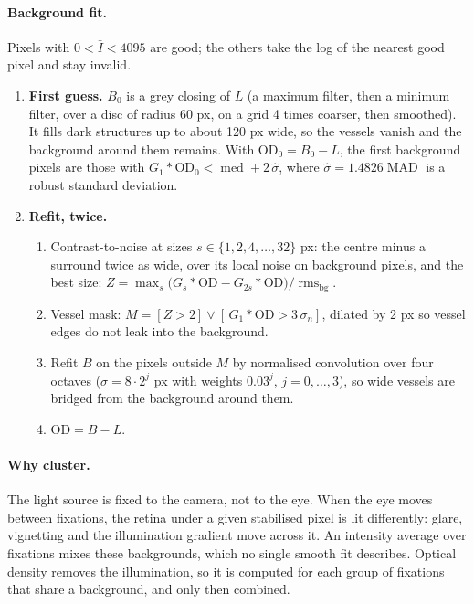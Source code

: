 \documentclass[11pt]{article}
\newcommand{\OD}{\mathrm{OD}}
\begin{document}
\paragraph{Background fit.} Pixels with $0 < \bar I < 4095$ are good; the others take the log of the nearest good
pixel and stay invalid.
\begin{enumerate}
  \item \textbf{First guess.} $B_0$ is a grey closing of $L$ (a maximum filter, then a minimum filter, over a disc
        of radius 60 px, on a grid 4 times coarser, then smoothed). It fills dark structures up to about 120 px
        wide, so the vessels vanish and the background around them remains. With $\OD_0 = B_0 - L$, the first
        background pixels are those with $G_1 * \OD_0 < \operatorname{med} + 2\,\hat\sigma$, where
        $\hat\sigma = 1.4826 \operatorname{MAD}$ is a robust standard deviation.
  \item \textbf{Refit, twice.}
        \begin{enumerate}
          \item Contrast-to-noise at sizes $s \in \{1, 2, 4, \dots, 32\}$ px: the centre minus a surround twice as
                wide, over its local noise on background pixels, and the best size:
                $Z = \max_s \bigl(G_s * \OD - G_{2s} * \OD\bigr) / \operatorname{rms}_\mathrm{bg}$.
          \item Vessel mask: $M = [Z > 2] \vee [\,G_1 * \OD > 3\,\sigma_n]$, dilated by 2 px so vessel edges do not
                leak into the background.
          \item Refit $B$ on the pixels outside $M$ by normalised convolution over four octaves
                ($\sigma = 8 \cdot 2^j$ px with weights $0.03^j$, $j = 0, \dots, 3$), so wide vessels are bridged
                from the background around them.
          \item $\OD = B - L$.
        \end{enumerate}
\end{enumerate}

\paragraph{Why cluster.} The light source is fixed to the camera, not to the eye. When the eye moves between
fixations, the retina under a given stabilised pixel is lit differently: glare, vignetting and the illumination
gradient move across it. An intensity average over fixations mixes these backgrounds, which no single smooth fit
describes. Optical density removes the illumination, so it is computed for each group of fixations that share a
background, and only then combined.
\end{document}
